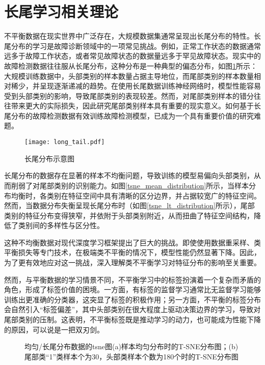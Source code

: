 \documentclass[master]{thesis-uestc}
\begin{document}
\section{长尾学习相关理论}
不平衡数据在现实世界中广泛存在，大规模数据集通常呈现出长尾分布的特性。长尾分布的学习是故障诊断领域中的一项常见挑战。例如，正常工作状态的数据通常远多于故障工作状态，或者常见故障状态的数据量远多于罕见故障状态。现实中的故障检测数据往往服从长尾分布，这种分布是一种典型的偏态分布，如图\ref{fig_long_tail}所示：大规模训练数据中，头部类别的样本数量占据主导地位，而尾部类别的样本数量相对稀少，并呈现逐渐递减的趋势。在使用长尾数据训练神经网络时，模型性能容易受到头部类别的影响，导致尾部类别的表现较差。然而，对尾部类别样本的错分往往带来更大的实际损失，因此研究尾部类别样本具有重要的现实意义。如何基于长尾分布的故障检测数据有效训练故障检测模型，已成为一个具有重要价值的研究难题。
\begin{figure}[h]
    \texttt{[image: long\_tail.pdf]}
    \caption{长尾分布示意图}
    \label{fig_long_tail}
\end{figure}

长尾分布的数据存在显著的样本不均衡问题，导致训练的模型易偏向头部类别，从而削弱了对尾部类别的识别能力。如图\ref{tsne_mean_distribution}所示，当样本分布均衡时，各类别在特征空间中具有清晰的区分边界，并占据较宽广的特征空间。然而，当数据分布失衡呈现长尾分布时（如图\ref{tsne_lt_distribution}所示），尾部类别的特征分布变得狭窄，并依附于头部类别附近，从而扭曲了特征空间结构，降低了类别间的多样性与区分性。

这种不均衡数据对现代深度学习框架提出了巨大的挑战。即使使用数据重采样、类平衡损失等专门技术，在极端类不平衡的情况下，模型性能仍然显著下降。因此，为了更有效地应对这一挑战，深入理解类不平衡学习对特征分布的影响至关重要。

然而，与平衡数据的学习情景不同，不平衡学习中的标签扮演着一个复杂而矛盾的角色，形成了标签价值的困境。一方面，有标签的监督学习通常比无监督学习能够训练出更准确的分类器，这突显了标签的积极作用；另一方面，不平衡的标签分布会自然引入“标签偏差”，其中头部类别在很大程度上驱动决策边界的学习，导致对尾部类别的压制。这表明，不平衡标签既是推动学习的动力，也可能成为性能下降的原因，可以说是一把双刃剑。
\begin{figure}[h]
    \caption{均匀/长尾分布数据的tsne图(a)样本均匀分布时的T-SNE分布图；(b)尾部类“1”类样本个为30，头部类样本个数为180个时的T-SNE分布图}
    \label{long-tail result}
\end{figure}
\end{document}
